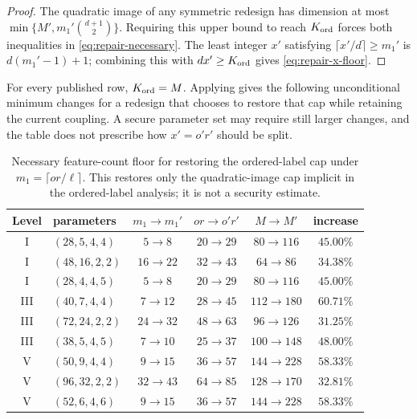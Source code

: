 \documentclass[11pt]{article}
\begin{document}
\begin{proof}
The quadratic image of any symmetric redesign has dimension at most
$\min\{M',m_1'\binom{d+1}{2}\}$.  Requiring this upper bound to reach
$K_{\rm ord}$ forces both inequalities in \eqref{eq:repair-necessary}.  The
least integer $x'$ satisfying $\lceil x'/d\rceil\ge m_1'$ is
$d(m_1'-1)+1$; combining this with $dx'\ge K_{\rm ord}$ gives
\eqref{eq:repair-x-floor}.
\end{proof}

For every published row, $K_{\rm ord}=M$.  Applying
 gives the following unconditional minimum changes for
a redesign that chooses to restore that cap while retaining the current
coupling.  A secure parameter set may require still larger changes, and the
table does not prescribe how $x'=o'r'$ should be split.

\begin{table}[H]
\centering
\caption{Necessary feature-count floor for restoring the ordered-label cap under
$m_1=\lceil or/\ell\rceil$.  This restores only the quadratic-image cap
implicit in the ordered-label analysis; it is not a security estimate.}
\label{tab:repair-floor}
\scriptsize
\setlength{\tabcolsep}{3.2pt}
\begin{tabular}{@{}c l c c c c@{}}
\toprule
Level & parameters & $m_1\to m_1'$ & $or\to o'r'$ & $M\to M'$ & increase\\
\midrule
I   & $(28,5,4,4)$  & $5\to8$   & $20\to29$ & $80\to116$  & $45.00\%$\\
I   & $(48,16,2,2)$ & $16\to22$ & $32\to43$ & $64\to86$   & $34.38\%$\\
I   & $(28,4,4,5)$  & $5\to8$   & $20\to29$ & $80\to116$  & $45.00\%$\\
\midrule
III & $(40,7,4,4)$  & $7\to12$  & $28\to45$ & $112\to180$ & $60.71\%$\\
III & $(72,24,2,2)$ & $24\to32$ & $48\to63$ & $96\to126$  & $31.25\%$\\
III & $(38,5,4,5)$  & $7\to10$  & $25\to37$ & $100\to148$ & $48.00\%$\\
\midrule
V   & $(50,9,4,4)$  & $9\to15$  & $36\to57$ & $144\to228$ & $58.33\%$\\
V   & $(96,32,2,2)$ & $32\to43$ & $64\to85$ & $128\to170$ & $32.81\%$\\
V   & $(52,6,4,6)$  & $9\to15$  & $36\to57$ & $144\to228$ & $58.33\%$\\
\bottomrule
\end{tabular}
\end{table}
\end{document}
